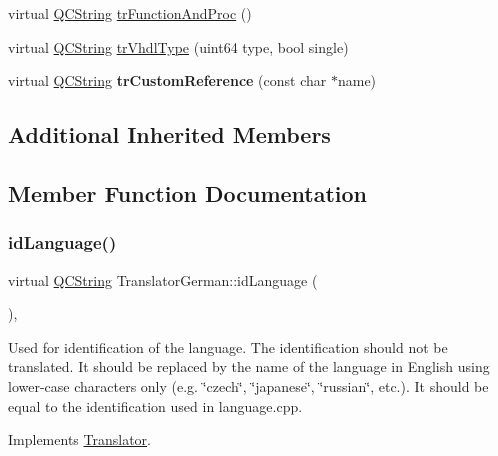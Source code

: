 \begin{DoxyCompactItemize}
\item 
virtual \mbox{\hyperlink{class_q_c_string}{Q\+C\+String}} \mbox{\hyperlink{class_translator_german_a9e88578f6b520c4dfad3cf6df094f728}{tr\+Function\+And\+Proc}} ()
\item 
virtual \mbox{\hyperlink{class_q_c_string}{Q\+C\+String}} \mbox{\hyperlink{class_translator_german_aaf491e95c9b30b1a99025c8287c42029}{tr\+Vhdl\+Type}} (uint64 type, bool single)
\item 
\mbox{\label{class_translator_german_ada920e36b1c660c6537b730fb85f3826}} 
virtual \mbox{\hyperlink{class_q_c_string}{Q\+C\+String}} {\bfseries tr\+Custom\+Reference} (const char $\ast$name)
\end{DoxyCompactItemize}
\subsection*{Additional Inherited Members}


\subsection{Member Function Documentation}
\mbox{\label{class_translator_german_a82f8ab5c8c82b00409b6afad3b515f2b}} 
\subsubsection{\texorpdfstring{idLanguage()}{idLanguage()}}
{\footnotesize\ttfamily virtual \mbox{\hyperlink{class_q_c_string}{Q\+C\+String}} Translator\+German\+::id\+Language (\begin{DoxyParamCaption}{ }\end{DoxyParamCaption})\hspace{0.3cm}{\ttfamily [inline]}, {\ttfamily [virtual]}}

Used for identification of the language. The identification should not be translated. It should be replaced by the name of the language in English using lower-\/case characters only (e.\+g. \char`\"{}czech\char`\"{}, \char`\"{}japanese\char`\"{}, \char`\"{}russian\char`\"{}, etc.). It should be equal to the identification used in language.\+cpp. 

Implements \mbox{\hyperlink{class_translator}{Translator}}.

